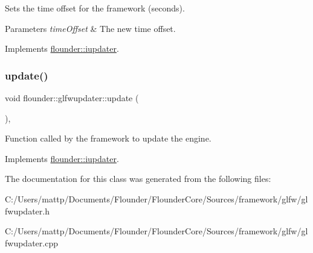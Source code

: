 Sets the time offset for the framework (seconds). 


\begin{DoxyParams}{Parameters}
{\em time\+Offset} & The new time offset. \\
\hline
\end{DoxyParams}


Implements \hyperlink{classflounder_1_1iupdater_aa6aa143e40a5a39bcd53753798438ea1}{flounder\+::iupdater}.

\mbox{\label{classflounder_1_1glfwupdater_a2443d270f702e67ab44c7afb88c71a5e}} 
\subsubsection{\texorpdfstring{update()}{update()}}
{\footnotesize\ttfamily void flounder\+::glfwupdater\+::update (\begin{DoxyParamCaption}{ }\end{DoxyParamCaption})\hspace{0.3cm}{\ttfamily [override]}, {\ttfamily [virtual]}}



Function called by the framework to update the engine. 



Implements \hyperlink{classflounder_1_1iupdater_a9f9102652e1ec25f7e9fc9b1cd57a041}{flounder\+::iupdater}.



The documentation for this class was generated from the following files\+:\begin{DoxyCompactItemize}
\item 
C\+:/\+Users/mattp/\+Documents/\+Flounder/\+Flounder\+Core/\+Sources/framework/glfw/glfwupdater.\+h\item 
C\+:/\+Users/mattp/\+Documents/\+Flounder/\+Flounder\+Core/\+Sources/framework/glfw/glfwupdater.\+cpp\end{DoxyCompactItemize}
